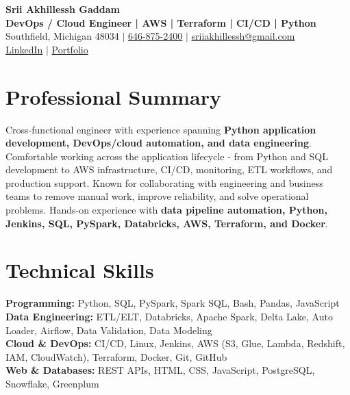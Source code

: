 \documentclass[letterpaper,10pt]{article}
\begin{document}
\fontsize{9.35pt}{10.45pt}\selectfont

\begin{center}
    {\LARGE \textbf{Srii Akhillessh Gaddam}} \\[-1pt]
    \textbf{DevOps / Cloud Engineer | AWS | Terraform | CI/CD | Python} \\[2pt]
    Southfield, Michigan 48034 $|$
    \href{tel:6468752400}{646-875-2400} $|$
    \href{mailto:sriiakhillessh@gmail.com}{sriiakhillessh@gmail.com} \\[1pt]
    \href{https://www.linkedin.com/in/srii-akhiilessh-gaddam-b48668191/}{LinkedIn} $|$
    \href{https://sriiakhillesshg.github.io/portfolio/}{Portfolio}
\end{center}
\vspace{-8pt}

\section{Professional Summary}
\small{Cross-functional engineer with experience spanning \textbf{Python application development, DevOps/cloud automation, and data engineering}. Comfortable working across the application lifecycle - from Python and SQL development to AWS infrastructure, CI/CD, monitoring, ETL workflows, and production support. Known for collaborating with engineering and business teams to remove manual work, improve reliability, and solve operational problems. Hands-on experience with \textbf{data pipeline automation, Python, Jenkins, SQL, PySpark, Databricks, AWS, Terraform, and Docker}.}

\section{Technical Skills}
\small{
\textbf{Programming:} Python, SQL, PySpark, Spark SQL, Bash, Pandas, JavaScript \\
\textbf{Data Engineering:} ETL/ELT, Databricks, Apache Spark, Delta Lake, Auto Loader, Airflow, Data Validation, Data Modeling \\
\textbf{Cloud \& DevOps:} CI/CD, Linux, Jenkins, AWS (S3, Glue, Lambda, Redshift, IAM, CloudWatch), Terraform, Docker, Git, GitHub \\
\textbf{Web \& Databases:} REST APIs, HTML, CSS, JavaScript, PostgreSQL, Snowflake, Greenplum
}
\end{document}
